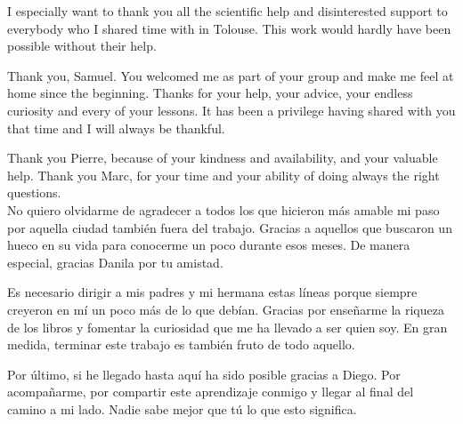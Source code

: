 \starbreak


I especially want to thank you all the scientific help and disinterested support to everybody who I shared time with in Tolouse. This work would hardly have been possible without their help.

Thank you, Samuel. You welcomed me as part of your group and make me feel at home since the beginning. Thanks for your help, your advice, your endless curiosity and every of your lessons. It has been a privilege having shared with you that time and I will always be thankful. 

Thank you Pierre, because of your kindness and availability, and your valuable help. Thank you Marc, for your time and your ability of doing always the right questions. \\%

No quiero olvidarme de agradecer a todos los que hicieron más amable mi paso por aquella ciudad también fuera del trabajo. Gracias a aquellos que buscaron un hueco en su vida para conocerme un poco durante esos meses. De manera especial, gracias Danila por tu amistad.  

\starbreak

Es necesario dirigir a mis padres y mi hermana estas líneas porque siempre creyeron en mí un poco más de lo que debían. Gracias por enseñarme la riqueza de los libros y fomentar la curiosidad que me ha llevado a ser quien soy. En gran medida, terminar este trabajo es también fruto de todo aquello.

Por último, si he llegado hasta aquí ha sido posible gracias a Diego. Por acompañarme, por compartir este aprendizaje conmigo y llegar al final del camino a mi lado. Nadie sabe mejor que tú lo que esto significa. 

\starbreak




